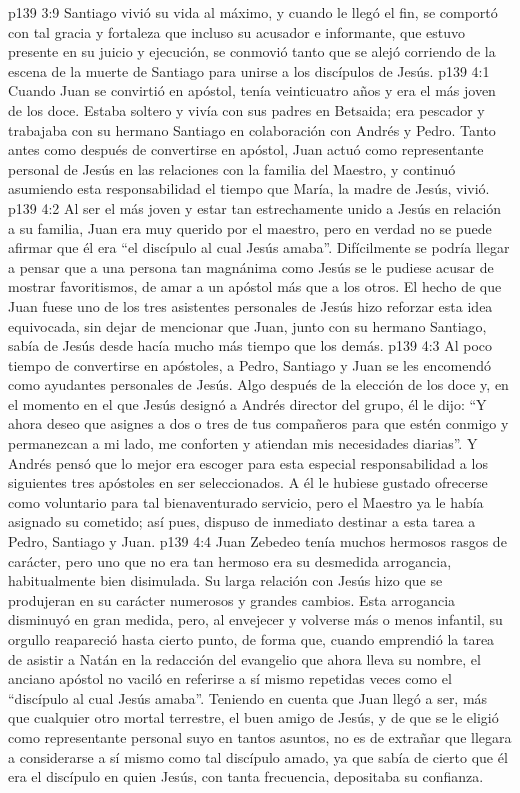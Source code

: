 \vs p139 3:9 \pc Santiago vivió su vida al máximo, y cuando le llegó el fin, se comportó con tal gracia y fortaleza que incluso su acusador e informante, que estuvo presente en su juicio y ejecución, se conmovió tanto que se alejó corriendo de la escena de la muerte de Santiago para unirse a los discípulos de Jesús.
\vs p139 4:1 Cuando Juan se convirtió en apóstol, tenía veinticuatro años y era el más joven de los doce. Estaba soltero y vivía con sus padres en Betsaida; era pescador y trabajaba con su hermano Santiago en colaboración con Andrés y Pedro. Tanto antes como después de convertirse en apóstol, Juan actuó como representante personal de Jesús en las relaciones con la familia del Maestro, y continuó asumiendo esta responsabilidad el tiempo que María, la madre de Jesús, vivió.
\vs p139 4:2 Al ser el más joven y estar tan estrechamente unido a Jesús en relación a su familia, Juan era muy querido por el maestro, pero en verdad no se puede afirmar que él era “el discípulo al cual Jesús amaba”. Difícilmente se podría llegar a pensar que a una persona tan magnánima como Jesús se le pudiese acusar de mostrar favoritismos, de amar a un apóstol más que a los otros. El hecho de que Juan fuese uno de los tres asistentes personales de Jesús hizo reforzar esta idea equivocada, sin dejar de mencionar que Juan, junto con su hermano Santiago, sabía de Jesús desde hacía mucho más tiempo que los demás.
\vs p139 4:3 \pc Al poco tiempo de convertirse en apóstoles, a Pedro, Santiago y Juan se les encomendó como ayudantes personales de Jesús. Algo después de la elección de los doce y, en el momento en el que Jesús designó a Andrés director del grupo, él le dijo: “Y ahora deseo que asignes a dos o tres de tus compañeros para que estén conmigo y permanezcan a mi lado, me conforten y atiendan mis necesidades diarias”. Y Andrés pensó que lo mejor era escoger para esta especial responsabilidad a los siguientes tres apóstoles en ser seleccionados. A él le hubiese gustado ofrecerse como voluntario para tal bienaventurado servicio, pero el Maestro ya le había asignado su cometido; así pues, dispuso de inmediato destinar a esta tarea a Pedro, Santiago y Juan.
\vs p139 4:4 \pc Juan Zebedeo tenía muchos hermosos rasgos de carácter, pero uno que no era tan hermoso era su desmedida arrogancia, habitualmente bien disimulada. Su larga relación con Jesús hizo que se produjeran en su carácter numerosos y grandes cambios. Esta arrogancia disminuyó en gran medida, pero, al envejecer y volverse más o menos infantil, su orgullo reapareció hasta cierto punto, de forma que, cuando emprendió la tarea de asistir a Natán en la redacción del evangelio que ahora lleva su nombre, el anciano apóstol no vaciló en referirse a sí mismo repetidas veces como el “discípulo al cual Jesús amaba”. Teniendo en cuenta que Juan llegó a ser, más que cualquier otro mortal terrestre, el buen amigo de Jesús, y de que se le eligió como representante personal suyo en tantos asuntos, no es de extrañar que llegara a considerarse a sí mismo como tal discípulo amado, ya que sabía de cierto que él era el discípulo en quien Jesús, con tanta frecuencia, depositaba su confianza.
